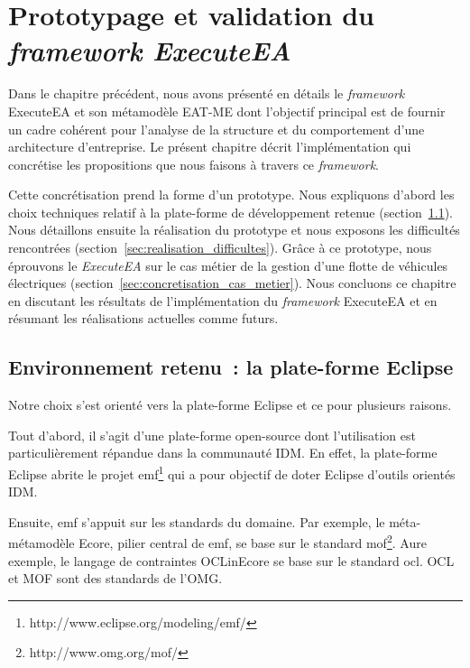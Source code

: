\chapter{Prototypage et validation du \emph{framework ExecuteEA}}
\label{ch:implem}

\PartialToc

Dans le chapitre précédent, nous avons présenté en détails le \emph{framework}
ExecuteEA et son métamodèle EAT-ME dont l'objectif principal est de fournir
un cadre cohérent pour l'analyse de la structure et du comportement d'une
architecture d'entreprise. Le présent chapitre décrit l'implémentation qui concrétise
les propositions que nous faisons à travers ce \emph{framework}. 

Cette concrétisation prend la forme d'un prototype. Nous expliquons d'abord les
choix techniques relatif à la plate-forme de développement retenue (section~\ref{sec:Eclipse}).
Nous détaillons ensuite la réalisation du prototype et nous exposons les difficultés
rencontrées (section~\ref{sec:realisation_difficultes}). Grâce à ce prototype, nous éprouvons le \emph{ExecuteEA} sur le cas métier de la gestion
d'une flotte de véhicules électriques (section~\ref{sec:concretisation_cas_metier}). 
Nous concluons ce chapitre en discutant les résultats de l'implémentation du \emph{framework} 
ExecuteEA et en résumant les réalisations actuelles comme futurs.



\section{Environnement retenu~: la plate-forme Eclipse}
\label{sec:Eclipse}

Notre choix s'est orienté vers la plate-forme Eclipse et ce pour plusieurs
raisons.

Tout d'abord, il s'agit d'une plate-forme open-source dont l'utilisation est
particulièrement répandue dans la communauté IDM. En effet, la plate-forme
Eclipse abrite le projet
\gls{emf}\footnote{http://www.eclipse.org/modeling/emf/} qui a pour objectif de
doter Eclipse d'outils orientés IDM.

Ensuite, \gls{emf} s'appuit sur les standards du domaine. Par exemple, le méta-métamodèle Ecore, pilier central de \gls{emf}, se base sur le standard
\gls{mof}\footnote{http://www.omg.org/mof/}. Aure exemple, le langage de
contraintes OCLinEcore se base sur le standard \gls{ocl}. OCL et MOF sont des
standards de l'OMG.

